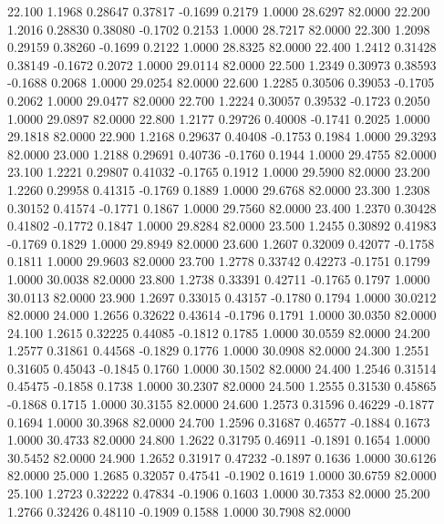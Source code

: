   22.100   1.1968   0.28647   0.37817  -0.1699   0.2179   1.0000  28.6297  82.0000
  22.200   1.2016   0.28830   0.38080  -0.1702   0.2153   1.0000  28.7217  82.0000
  22.300   1.2098   0.29159   0.38260  -0.1699   0.2122   1.0000  28.8325  82.0000
  22.400   1.2412   0.31428   0.38149  -0.1672   0.2072   1.0000  29.0114  82.0000
  22.500   1.2349   0.30973   0.38593  -0.1688   0.2068   1.0000  29.0254  82.0000
  22.600   1.2285   0.30506   0.39053  -0.1705   0.2062   1.0000  29.0477  82.0000
  22.700   1.2224   0.30057   0.39532  -0.1723   0.2050   1.0000  29.0897  82.0000
  22.800   1.2177   0.29726   0.40008  -0.1741   0.2025   1.0000  29.1818  82.0000
  22.900   1.2168   0.29637   0.40408  -0.1753   0.1984   1.0000  29.3293  82.0000
  23.000   1.2188   0.29691   0.40736  -0.1760   0.1944   1.0000  29.4755  82.0000
  23.100   1.2221   0.29807   0.41032  -0.1765   0.1912   1.0000  29.5900  82.0000
  23.200   1.2260   0.29958   0.41315  -0.1769   0.1889   1.0000  29.6768  82.0000
  23.300   1.2308   0.30152   0.41574  -0.1771   0.1867   1.0000  29.7560  82.0000
  23.400   1.2370   0.30428   0.41802  -0.1772   0.1847   1.0000  29.8284  82.0000
  23.500   1.2455   0.30892   0.41983  -0.1769   0.1829   1.0000  29.8949  82.0000
  23.600   1.2607   0.32009   0.42077  -0.1758   0.1811   1.0000  29.9603  82.0000
  23.700   1.2778   0.33742   0.42273  -0.1751   0.1799   1.0000  30.0038  82.0000
  23.800   1.2738   0.33391   0.42711  -0.1765   0.1797   1.0000  30.0113  82.0000
  23.900   1.2697   0.33015   0.43157  -0.1780   0.1794   1.0000  30.0212  82.0000
  24.000   1.2656   0.32622   0.43614  -0.1796   0.1791   1.0000  30.0350  82.0000
  24.100   1.2615   0.32225   0.44085  -0.1812   0.1785   1.0000  30.0559  82.0000
  24.200   1.2577   0.31861   0.44568  -0.1829   0.1776   1.0000  30.0908  82.0000
  24.300   1.2551   0.31605   0.45043  -0.1845   0.1760   1.0000  30.1502  82.0000
  24.400   1.2546   0.31514   0.45475  -0.1858   0.1738   1.0000  30.2307  82.0000
  24.500   1.2555   0.31530   0.45865  -0.1868   0.1715   1.0000  30.3155  82.0000
  24.600   1.2573   0.31596   0.46229  -0.1877   0.1694   1.0000  30.3968  82.0000
  24.700   1.2596   0.31687   0.46577  -0.1884   0.1673   1.0000  30.4733  82.0000
  24.800   1.2622   0.31795   0.46911  -0.1891   0.1654   1.0000  30.5452  82.0000
  24.900   1.2652   0.31917   0.47232  -0.1897   0.1636   1.0000  30.6126  82.0000
  25.000   1.2685   0.32057   0.47541  -0.1902   0.1619   1.0000  30.6759  82.0000
  25.100   1.2723   0.32222   0.47834  -0.1906   0.1603   1.0000  30.7353  82.0000
  25.200   1.2766   0.32426   0.48110  -0.1909   0.1588   1.0000  30.7908  82.0000
